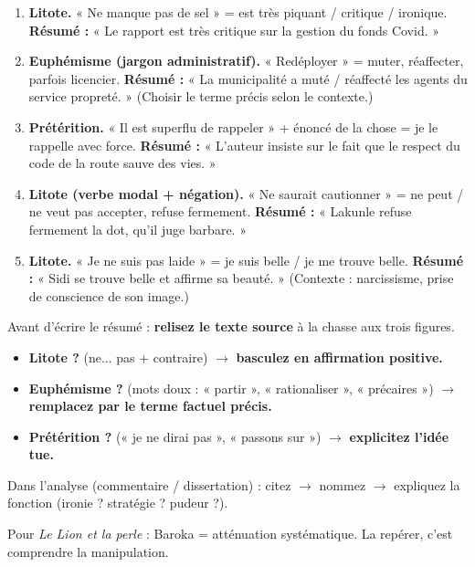 \documentclass[11pt]{article}
\newcommand{\cle}[1]{{\popxbold\color{popdark}#1}}
\begin{document}
\begin{corrige}
\begin{enumerate}
    \item \textbf{Litote.} « Ne manque pas de sel » = est très piquant / critique / ironique. \textbf{Résumé :} « Le rapport est très critique sur la gestion du fonds Covid. »
    \item \textbf{Euphémisme (jargon administratif).} « Redéployer » = muter, réaffecter, parfois licencier. \textbf{Résumé :} « La municipalité a muté / réaffecté les agents du service propreté. » (Choisir le terme précis selon le contexte.)
    \item \textbf{Prétérition.} « Il est superflu de rappeler » + énoncé de la chose = je le rappelle avec force. \textbf{Résumé :} « L'auteur insiste sur le fait que le respect du code de la route sauve des vies. »
    \item \textbf{Litote (verbe modal + négation).} « Ne saurait cautionner » = ne peut / ne veut pas accepter, refuse fermement. \textbf{Résumé :} « Lakunle refuse fermement la dot, qu'il juge barbare. »
    \item \textbf{Litote.} « Je ne suis pas laide » = je suis belle / je me trouve belle. \textbf{Résumé :} « Sidi se trouve belle et affirme sa beauté. » (Contexte : narcissisme, prise de conscience de son image.)
\end{enumerate}
\end{corrige}

\begin{aretenir}
\cle{Avant d'écrire le résumé :} \textbf{relisez le texte source} à la chasse aux trois figures.
\begin{itemize}
    \item \textbf{Litote ?} (ne... pas + contraire) $\rightarrow$ \textbf{basculez en affirmation positive.}
    \item \textbf{Euphémisme ?} (mots doux : « partir », « rationaliser », « précaires ») $\rightarrow$ \textbf{remplacez par le terme factuel précis.}
    \item \textbf{Prétérition ?} (« je ne dirai pas », « passons sur ») $\rightarrow$ \textbf{explicitez l'idée tue.}
\end{itemize}
\cle{Dans l'analyse (commentaire / dissertation) :} citez $\rightarrow$ nommez $\rightarrow$ expliquez la fonction (ironie ? stratégie ? pudeur ?).

\cle{Pour \emph{Le Lion et la perle} :} Baroka = atténuation systématique. La repérer, c'est comprendre la manipulation.
\end{aretenir}
\end{document}
